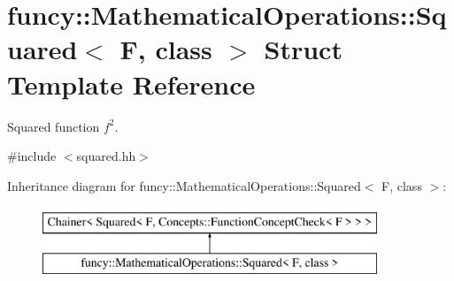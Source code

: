 \hypertarget{structfuncy_1_1MathematicalOperations_1_1Squared}{\section{funcy\-:\-:Mathematical\-Operations\-:\-:Squared$<$ F, class $>$ Struct Template Reference}
\label{structfuncy_1_1MathematicalOperations_1_1Squared}
}


Squared function $f^2$.  




{\ttfamily \#include $<$squared.\-hh$>$}

Inheritance diagram for funcy\-:\-:Mathematical\-Operations\-:\-:Squared$<$ F, class $>$\-:\begin{figure}[H]
\begin{center}
\leavevmode
\includegraphics[height=2.000000cm]{structfuncy_1_1MathematicalOperations_1_1Squared}
\end{center}
\end{figure}
